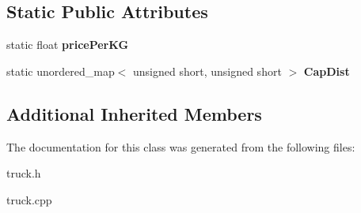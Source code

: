 \subsection*{Static Public Attributes}
\begin{DoxyCompactItemize}
\item 
\mbox{\label{class_normal_a8aae6212077e4f0c359d7fcfb5af3743}} 
static float {\bfseries price\+Per\+KG}
\item 
\mbox{\label{class_normal_a48e5e4fa19cabc03b69aec4ea4e76b6f}} 
static unordered\+\_\+map$<$ unsigned short, unsigned short $>$ {\bfseries Cap\+Dist}
\end{DoxyCompactItemize}
\subsection*{Additional Inherited Members}


The documentation for this class was generated from the following files\+:\begin{DoxyCompactItemize}
\item 
truck.\+h\item 
truck.\+cpp\end{DoxyCompactItemize}
